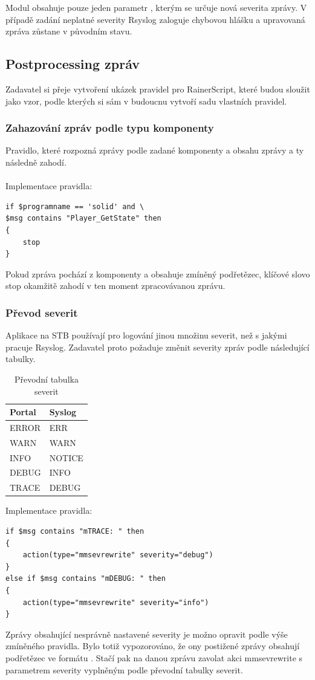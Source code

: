 \documentclass[thesis=B,czech]{FITthesis}[2012/06/26]
\begin{document}
Modul obsahuje pouze jeden parametr , kterým se určuje nová severita zprávy. V případě zadání neplatné severity Rsyslog zaloguje chybovou hlášku a upravovaná zpráva zůstane v původním stavu.

\subsection{Postprocessing zpráv}
Zadavatel si přeje vytvoření ukázek pravidel pro RainerScript, které budou sloužit jako vzor, podle kterých si sám v budoucnu vytvoří sadu vlastních pravidel.

\subsubsection{Zahazování zpráv podle typu komponenty}
Pravidlo, které rozpozná zprávy podle zadané komponenty a obsahu zprávy a ty následně zahodí.
\\
\\
Implementace pravidla:
\begin{lstlisting}[style=RainerScriptStyle]
if $programname == 'solid' and \
$msg contains "Player_GetState" then
{	
	stop
}
\end{lstlisting}
Pokud zpráva pochází z komponenty  a obsahuje zmíněný podřetězec, klíčové slovo stop okamžitě zahodí v ten moment zpracovávanou zprávu.
\\
\subsubsection{Převod severit}
Aplikace na STB používají pro logování jinou množinu severit, než s jakými pracuje Rsyslog. Zadavatel proto požaduje změnit severity zpráv podle následující tabulky.

\begin{table}[H]
\centering
	\caption{Převodní tabulka severit}	\begin{tabular}{|l|l|}\hline
		Portal		& Syslog			\tabularnewline \hline \hline
		ERROR		& ERR			\tabularnewline \hline
		WARN		& WARN			\tabularnewline \hline
		INFO		& NOTICE			\tabularnewline \hline
		DEBUG		& INFO			\tabularnewline \hline
		TRACE		& DEBUG			\tabularnewline \hline
	\end{tabular}
\end{table}

Implementace pravidla:
\begin{lstlisting}[style=RainerScriptStyle]
if $msg contains "mTRACE: " then
{
	action(type="mmsevrewrite" severity="debug")
}
else if $msg contains "mDEBUG: " then
{
	action(type="mmsevrewrite" severity="info")
}
\end{lstlisting}
Zprávy obsahující nesprávně nastavené severity je možno opravit podle výše zmíněného pravidla. Bylo totiž vypozorováno, že ony postižené zprávy obsahují podřetězec ve formátu . Stačí pak na danou zprávu zavolat akci mmsevrewrite s parametrem severity vyplněným podle převodní tabulky severit.
\end{document}
